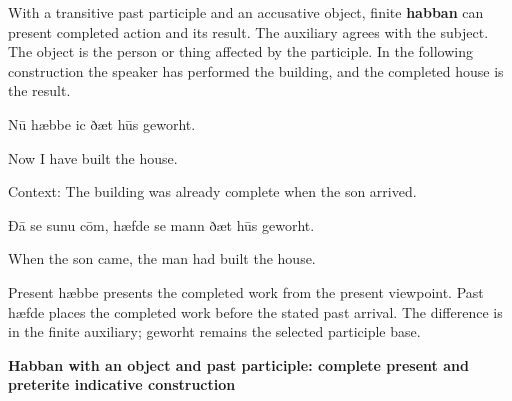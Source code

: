 With a transitive past participle and an accusative object, finite \textbf{habban} can present completed action and its result. The auxiliary agrees with the subject. The object is the person or thing affected by the participle. In the following construction the speaker has performed the building, and the completed house is the result.

Nū hæbbe ic ðæt hūs geworht.

Now I have built the house.

Context: The building was already complete when the son arrived.

Ðā se sunu cōm, hæfde se mann ðæt hūs geworht.

When the son came, the man had built the house.

Present hæbbe presents the completed work from the present viewpoint. Past hæfde places the completed work before the stated past arrival. The difference is in the finite auxiliary; geworht remains the selected participle base.

\textbf{Habban with an object and past participle: complete present and preterite indicative construction}

